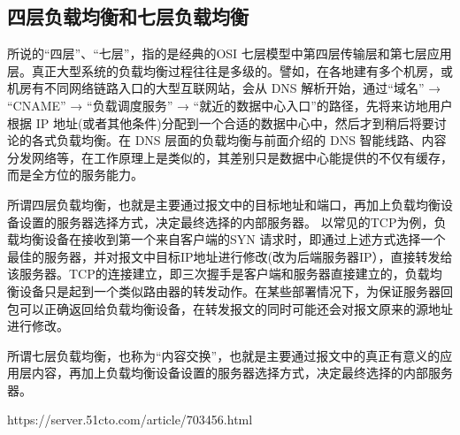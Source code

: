 \documentclass[../../../interview-questions.tex]{subfiles}
\begin{document}
\subsection{四层负载均衡和七层负载均衡}

所说的“四层”、“七层”，指的是经典的OSI 七层模型中第四层传输层和第七层应用层。真正大型系统的负载均衡过程往往是多级的。譬如，在各地建有多个机房，或机房有不同网络链路入口的大型互联网站，会从 DNS 解析开始，通过“域名” → “CNAME” → “负载调度服务” → “就近的数据中心入口”的路径，先将来访地用户根据 IP 地址(或者其他条件)分配到一个合适的数据中心中，然后才到稍后将要讨论的各式负载均衡。在 DNS 层面的负载均衡与前面介绍的 DNS 智能线路、内容分发网络等，在工作原理上是类似的，其差别只是数据中心能提供的不仅有缓存，而是全方位的服务能力。

所谓四层负载均衡，也就是主要通过报文中的目标地址和端口，再加上负载均衡设备设置的服务器选择方式，决定最终选择的内部服务器。
以常见的TCP为例，负载均衡设备在接收到第一个来自客户端的SYN 请求时，即通过上述方式选择一个最佳的服务器，并对报文中目标IP地址进行修改(改为后端服务器IP），直接转发给该服务器。TCP的连接建立，即三次握手是客户端和服务器直接建立的，负载均衡设备只是起到一个类似路由器的转发动作。在某些部署情况下，为保证服务器回包可以正确返回给负载均衡设备，在转发报文的同时可能还会对报文原来的源地址进行修改。

所谓七层负载均衡，也称为“内容交换”，也就是主要通过报文中的真正有意义的应用层内容，再加上负载均衡设备设置的服务器选择方式，决定最终选择的内部服务器。

https://server.51cto.com/article/703456.html
\end{document}
